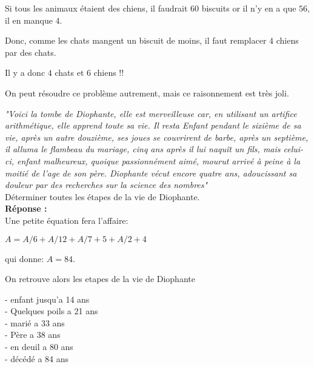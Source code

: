 \documentclass[twocolumn]{article}
\begin{document}
Si tous les animaux étaient des chiens, il faudrait $60$ biscuits or il n'y 
en a que $56$, il en manque $4$.

Donc, comme les chats mangent un biscuit de moins, il faut remplacer $4$ 
chiens par des chats.

Il y a donc $4$ chats et $6$ chiens !!

On peut résoudre ce problème autrement, mais ce raisonnement est très joli.


\par
\vspace{3mm}

\exo
\par
\textit{"Voici la tombe de Diophante, elle est merveilleuse car, en utilisant un artifice arithmétique, elle apprend toute sa vie. Il resta Enfant pendant le sixième de sa vie, après un autre douzième, ses joues se couvrirent de barbe, après un septième, il alluma le flambeau du mariage, cinq ans après il lui naquît un fils, mais celui-ci, enfant malheureux, quoique passionnément aimé, mourut arrivé à peine à la moitié de l'age de son père. Diophante vécut encore quatre ans, adoucissant sa douleur par des recherches sur la science des nombres"}\\

Déterminer toutes les étapes de la vie de Diophante.\\

\textbf{Réponse :}\\

Une petite équation fera l'affaire:

$A = A/6 + A/12 + A/7 + 5 + A/2 + 4$

qui donne: $A = 84$.

On retrouve alors les etapes de la vie de Diophante

- enfant jusqu'a 14 ans\\

- Quelques poils a 21 ans\\

- marié a 33 ans\\

- Père a 38 ans\\

- en deuil a 80 ans\\

- décédé a 84 ans\\

\par
\vspace{3mm}
\end{document}
